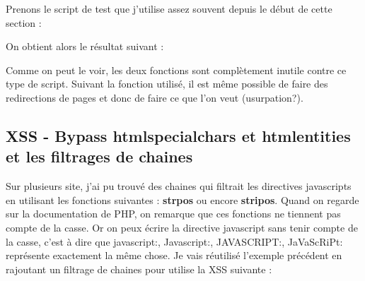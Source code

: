 \documentclass{article}
\begin{document}
Prenons le script de test que j'utilise assez souvent depuis le début de cette section :
\vspace{0.2cm}\\
\vspace{0.2cm}

On obtient alors le résultat suivant :
\vspace{0.2cm}\\
\vspace{0.2cm}

Comme on peut le voir, les deux fonctions sont complètement inutile contre ce type de script. Suivant la fonction utilisé, il est même possible de faire des redirections de pages et donc de faire ce que l'on veut (usurpation?).

\subsection{XSS - Bypass htmlspecialchars et htmlentities et les filtrages de chaines}

Sur plusieurs site, j'ai pu trouvé des chaines qui filtrait les directives javascripts en utilisant les fonctions suivantes : \textbf{strpos} ou encore \textbf{stripos}. Quand on regarde sur la documentation de PHP, on remarque que ces fonctions ne tiennent pas compte de la casse. Or on peux écrire la directive javascript sans tenir compte de la casse, c'est à dire que javascript:, Javascript:, JAVASCRIPT:, JaVaScRiPt: représente exactement la même chose. Je vais réutilisé l'exemple précédent en rajoutant un filtrage de chaines pour utilise la XSS suivante :
\vspace{0.2cm}\\
\vspace{0.2cm}
\end{document}
